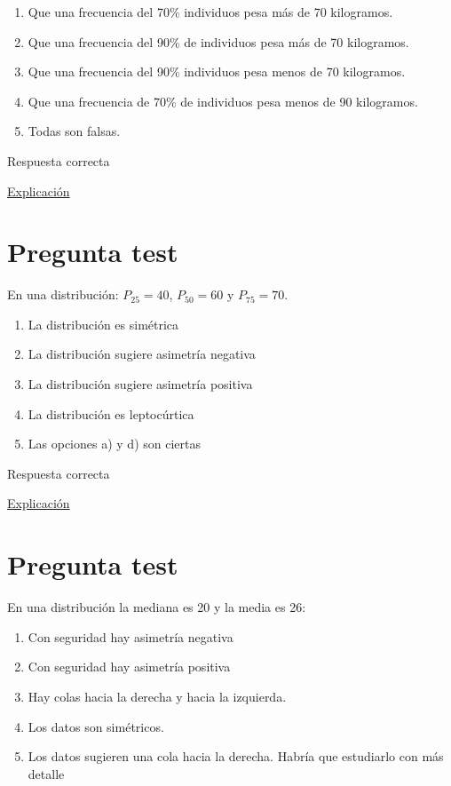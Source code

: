 \documentclass[
]{book}
\providecommand{\tightlist}{%
  \setlength{\itemsep}{0pt}\setlength{\parskip}{0pt}}
\begin{document}
\begin{enumerate}
\def\labelenumi{\alph{enumi})}
\tightlist
\item
  Que una frecuencia del 70\% individuos pesa más de 70 kilogramos.
\item
  Que una frecuencia del 90\% de individuos pesa más de 70 kilogramos.
\item
  Que una frecuencia del 90\% individuos pesa menos de 70 kilogramos.
\item
  Que una frecuencia de 70\% de individuos pesa menos de 90 kilogramos.
\item
  Todas son falsas.
\end{enumerate}

Respuesta correcta

\href{https://1fjmanzano.github.io/bioestadistica/medidas-de-posicio\%CC\%81n-dispersio\%CC\%81n-y-forma.html\#medidas-de-posicio\%CC\%81n-centrales}{Explicación}

\hypertarget{pregunta-test-92}{%
\section{Pregunta test}\label{pregunta-test-92}}

En una distribución: \(P_{25} = 40\), \(P_{50} =60\) y \(P_{75} =70\).

\begin{enumerate}
\def\labelenumi{\alph{enumi})}
\tightlist
\item
  La distribución es simétrica
\item
  La distribución sugiere asimetría negativa
\item
  La distribución sugiere asimetría positiva
\item
  La distribución es leptocúrtica
\item
  Las opciones a) y d) son ciertas
\end{enumerate}

Respuesta correcta

\href{https://1fjmanzano.github.io/bioestadistica/medidas-de-forma.html}{Explicación}

\hypertarget{pregunta-test-93}{%
\section{Pregunta test}\label{pregunta-test-93}}

En una distribución la mediana es 20 y la media es 26:

\begin{enumerate}
\def\labelenumi{\alph{enumi})}
\tightlist
\item
  Con seguridad hay asimetría negativa
\item
  Con seguridad hay asimetría positiva
\item
  Hay colas hacia la derecha y hacia la izquierda.
\item
  Los datos son simétricos.
\item
  Los datos sugieren una cola hacia la derecha. Habría que estudiarlo con más detalle
\end{enumerate}
\end{document}
